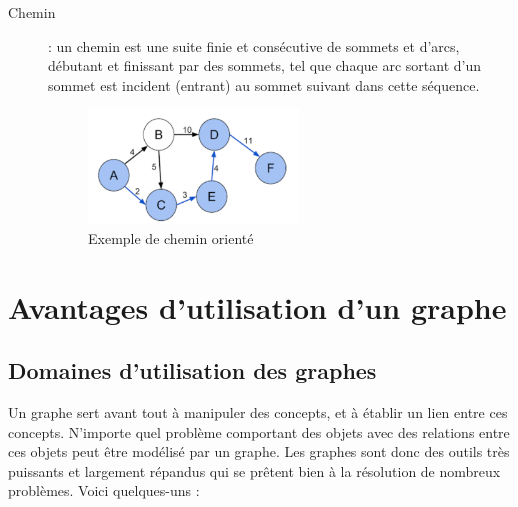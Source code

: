 \begin{description}
\item[Chemin] : un chemin est une suite finie et consécutive de sommets et d'arcs, débutant et finissant par des sommets, tel que chaque arc sortant d'un sommet est incident (entrant) au sommet suivant dans cette séquence.
\begin{figure}[h]
	\centering
	\includegraphics[width=0.55\textwidth]{img/cheminGraphe.png}
	\caption{Exemple de chemin orienté}
\end{figure}
\end{description}

	
	
\section{Avantages d'utilisation d'un graphe}
\subsection{Domaines d'utilisation des graphes}
Un graphe sert avant tout à manipuler des concepts, et à établir un lien entre ces concepts. N'importe quel problème comportant des objets avec des relations entre ces objets peut être modélisé par un graphe.
Les graphes sont donc des outils très puissants et largement répandus qui se prêtent bien à la résolution de nombreux problèmes. Voici quelques-uns :

